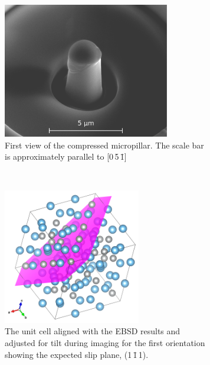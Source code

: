 \begin{figure}
\centering
\begin{subfigure}{0.45\textwidth}
\centering
\includegraphics[width=0.8\textwidth]{pillar_3_v1}
\caption{First view of the compressed  micropillar. The scale bar is approximately parallel to [0\,5\,\={1}]}
\end{subfigure}
~
\begin{subfigure}{0.45\textwidth}
\centering
\includegraphics[width=0.66\textwidth]{Pillar_3_unit_cell_v1}
\caption{The unit cell aligned with the EBSD results and adjusted for tilt during imaging for the first orientation showing the expected slip plane, (1\,\={1}\,1).}
\end{subfigure}
\par\bigskip
\begin{subfigure}{0.45\textwidth}
\centering

\end{subfigure}
\end{figure}
